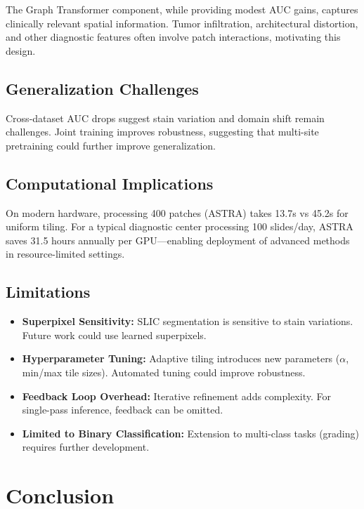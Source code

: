 \documentclass[runningheads]{llncs}
\begin{document}
The Graph Transformer component, while providing modest AUC gains, captures clinically relevant spatial information. Tumor infiltration, architectural distortion, and other diagnostic features often involve patch interactions, motivating this design.

\subsection{Generalization Challenges}

Cross-dataset AUC drops suggest stain variation and domain shift remain challenges. Joint training improves robustness, suggesting that multi-site pretraining could further improve generalization.

\subsection{Computational Implications}

On modern hardware, processing 400 patches (ASTRA) takes 13.7s vs 45.2s for uniform tiling. For a typical diagnostic center processing 100 slides/day, ASTRA saves 31.5 hours annually per GPU—enabling deployment of advanced methods in resource-limited settings.

\subsection{Limitations}

\begin{itemize}

\item \textbf{Superpixel Sensitivity:} SLIC segmentation is sensitive to stain variations. Future work could use learned superpixels.

\item \textbf{Hyperparameter Tuning:} Adaptive tiling introduces new parameters ($\alpha$, min/max tile sizes). Automated tuning could improve robustness.

\item \textbf{Feedback Loop Overhead:} Iterative refinement adds complexity. For single-pass inference, feedback can be omitted.

\item \textbf{Limited to Binary Classification:} Extension to multi-class tasks (grading) requires further development.

\end{itemize}

\section{Conclusion}
\end{document}
